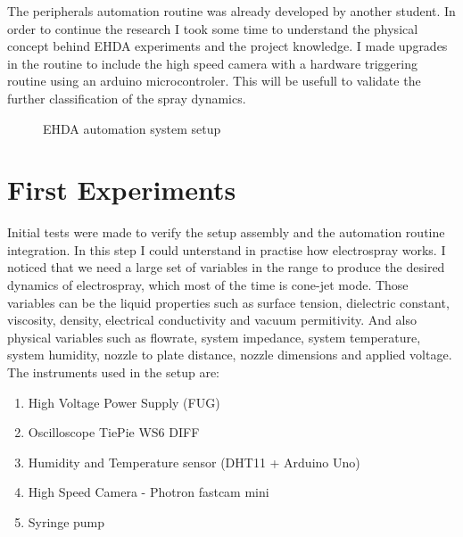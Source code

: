The peripherals automation routine was already developed by another student. In order to continue the research I took some time to understand the physical concept behind EHDA experiments and the project knowledge.
I made upgrades in the routine to include the high speed camera with a hardware triggering routine using an arduino microcontroler. This will be usefull to validate the further classification of the spray dynamics.



\begin{figure}[H]
  \centering
  \caption{EHDA automation system setup}
  \label{fig:setup}
\end{figure}


\section{First Experiments}
\label{sec:first_experiments}

Initial tests were made to verify the setup assembly and the automation routine integration. In this step I could unterstand in practise how electrospray works.
I noticed that we need a large set of variables in the range to produce the desired dynamics of electrospray, which most of the time is cone-jet mode. Those variables can be the liquid properties such as surface tension, dielectric constant, viscosity, density, electrical conductivity and vacuum permitivity. And also physical variables such as flowrate, system impedance, system temperature, system humidity, nozzle to plate distance, nozzle dimensions and applied voltage.
The instruments used in the setup are:

\begin{enumerate}[a]
  \item High Voltage Power Supply (FUG)
  \item Oscilloscope TiePie WS6 DIFF 
  \item Humidity and Temperature sensor (DHT11 + Arduino Uno)
  \item High Speed Camera - Photron fastcam mini
  \item Syringe pump
  \end{enumerate}

\clearpage
